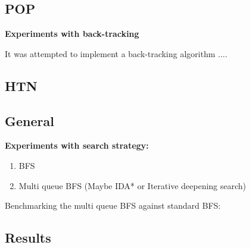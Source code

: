 \documentclass[Main]{subfiles}
\begin{document}
\subsection{POP}

\textbf{Experiments with back-tracking}

It was attempted to implement a back-tracking algorithm ....



\subsection{HTN}





\subsection{General} 


\textbf{Experiments with search strategy:}

\begin{enumerate}
    \item BFS 
    \item Multi queue BFS (Maybe IDA* or Iterative deepening search)
\end{enumerate}



Benchmarking the multi queue BFS against standard BFS:





\subsection{Results}
\end{document}
